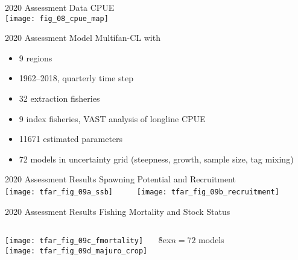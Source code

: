 \documentclass[aspectratio=169]{beamer}
\begin{document}
\begin{frame}{2020 Assessment Data}\fns
  \vspace{1ex}
  CPUE\\[1ex]
  \texttt{[image: fig\_08\_cpue\_map]}
  \vspace{1ex}
\end{frame}

\begin{frame}{2020 Assessment Model}\small
  Multifan-CL with\\[1ex]
  \begin{itemize}
    \item[] 9 regions\\[2ex]
    \item[] 1962--2018, quarterly time step\\[2ex]
    \item[] 32 extraction fisheries\\[2ex]
    \item[] 9 index fisheries, VAST analysis of longline CPUE\\[2ex]
    \item[] 11671 estimated parameters\\[2ex]
    \item[] 72 models in uncertainty grid (steepness, growth, sample size, tag
    mixing)\\[2ex]
  \end{itemize}
\end{frame}


\begin{frame}{2020 Assessment Results}\fns
  \vspace{1ex}
  Spawning Potential and Recruitment\\[4ex]
  \texttt{[image: tfar\_fig\_09a\_ssb]}~~~~~
  \texttt{[image: tfar\_fig\_09b\_recruitment]}
  \vspace{3ex}
\end{frame}


\begin{frame}{2020 Assessment Results}\fns
  \vspace{1.5ex}
  Fishing Mortality and Stock Status\\[1ex]
  \begin{columns}
    \texttt{[image: tfar\_fig\_09c\_fmortality]}~~~
    \centering
    \h{8ex}$n=72$ models\I{3ex}\\[1ex]
    \texttt{[image: tfar\_fig\_09d\_majuro\_crop]}
  \end{columns}
  \vspace{2ex}
\end{frame}
\end{document}
